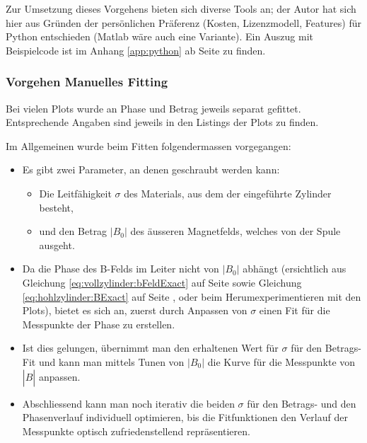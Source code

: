 Zur  Umsetzung  dieses Vorgehens  bieten  sich  diverse  Tools an;  der  Autor
hat  sich   hier  aus   Gr\"unden  der  pers\"onlichen   Pr\"aferenz  (Kosten,
Lizenzmodell,  Features) f\"ur  Python  entschieden (Matlab  w\"are auch  eine
Variante). Ein Auszug mit Beispielcode ist im Anhang \ref{app:python} ab Seite
\pageref{app:python} zu finden.


\clearpage
\subsubsection{Vorgehen Manuelles Fitting}
\label{sec:ausw:subsec:methodik:subsubsec:fitting}

Bei   vielen   Plots    wurde   an   Phase   und    Betrag   jeweils   separat
gefittet. Entsprechende  Angaben sind  jeweils in  den Listings  der Plots  zu
finden.


Im Allgemeinen wurde beim Fitten  folgendermassen vorgegangen:

\begin{itemize}
    \item
        Es gibt zwei Parameter, an denen geschraubt werden kann:
        \begin{itemize}
            \item
                Die  Leitf\"ahigkeit  $\sigma$  des  Materials,  aus  dem  der
                eingef\"uhrte Zylinder besteht,
            \item
                und den Betrag $|B_0|$ des \"ausseren Magnetfelds, welches von
                der Spule ausgeht.
        \end{itemize}
    \item
        Da   die   Phase   des   B-Felds   im   Leiter   nicht   von   $|B_0|$
        abh\"angt (ersichtlich  aus Gleichung \ref{eq:vollzylinder:bFeldExact}
        auf       Seite       \pageref{eq:vollzylinder:bFeldExact}       sowie
        Gleichung        \ref{eq:hohlzylinder:BExact}         auf        Seite
        \pageref{eq:hohlzylinder:BExact},  oder beim  Herumexperimentieren mit
        den  Plots), bietet  es sich  an, zuerst  durch Anpassen  von $\sigma$
        einen Fit f\"ur die Messpunkte der Phase zu erstellen.
    \item
        Ist dies gelungen, \"ubernimmt man  den erhaltenen Wert f\"ur $\sigma$
        f\"ur den Betrags-Fit und kann man mittels Tunen von $|B_0|$ die Kurve
        f\"ur die Messpunkte von $|\hat{B}|$ anpassen.
    \item
        Abschliessend  kann  man  noch  iterativ  die  beiden  $\sigma$  f\"ur
        den  Betrags- und  den Phasenverlauf  individuell optimieren,  bis die
        Fitfunktionen  den Verlauf  der  Messpunkte optisch  zufriedenstellend
        repr\"asentieren.
\end{itemize}


